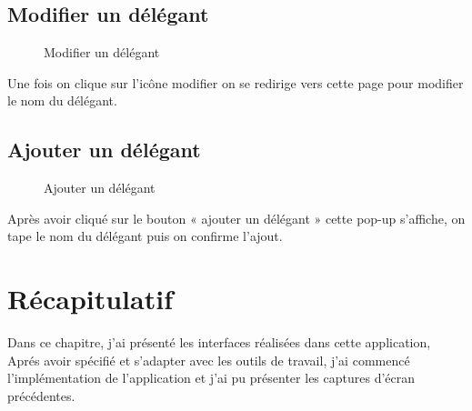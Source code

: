 \documentclass[a4paper]{report}
\begin{document}
\begin{doublespace}
\subsection{Modifier un délégant}
\begin{figure}[H]
	\begin{center}
		\caption{Modifier un délégant}
	\end{center}
\end{figure}
Une fois on clique sur l'icône modifier on se redirige vers cette page pour modifier le nom du délégant.
\subsection{Ajouter un délégant}
\begin{figure}[H]
	\begin{center}
		\caption{Ajouter un délégant}
	\end{center}
\end{figure}
Après avoir cliqué sur le bouton « ajouter un délégant » cette pop-up s'affiche, on tape le nom du délégant puis on confirme l'ajout.

\section{Récapitulatif}

Dans ce chapitre, j'ai présenté les interfaces réalisées dans cette application,
Aprés avoir spécifié et s'adapter avec les outils de travail, j'ai commencé l'implémentation de
l’application et j'ai pu présenter les captures d’écran précédentes.


\end{doublespace}
\end{document}
